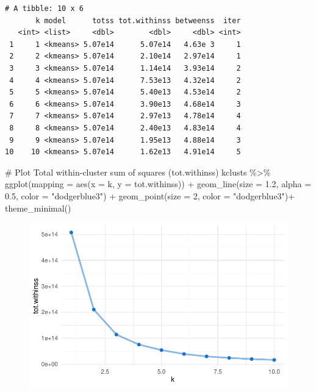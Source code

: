 \documentclass[
  letterpaper,
  DIV=11,
  numbers=noendperiod]{scrartcl}
\newenvironment{Shaded}{\begin{snugshade}}{\end{snugshade}}
\newcommand{\AttributeTok}[1]{\textcolor[rgb]{0.40,0.45,0.13}{#1}}
\newcommand{\CommentTok}[1]{\textcolor[rgb]{0.37,0.37,0.37}{#1}}
\newcommand{\DecValTok}[1]{\textcolor[rgb]{0.68,0.00,0.00}{#1}}
\newcommand{\FloatTok}[1]{\textcolor[rgb]{0.68,0.00,0.00}{#1}}
\newcommand{\FunctionTok}[1]{\textcolor[rgb]{0.28,0.35,0.67}{#1}}
\newcommand{\NormalTok}[1]{\textcolor[rgb]{0.00,0.23,0.31}{#1}}
\newcommand{\SpecialCharTok}[1]{\textcolor[rgb]{0.37,0.37,0.37}{#1}}
\newcommand{\StringTok}[1]{\textcolor[rgb]{0.13,0.47,0.30}{#1}}
\begin{document}
\begin{verbatim}
# A tibble: 10 x 6
       k model      totss tot.withinss betweenss  iter
   <int> <list>     <dbl>        <dbl>     <dbl> <int>
 1     1 <kmeans> 5.07e14      5.07e14   4.63e 3     1
 2     2 <kmeans> 5.07e14      2.10e14   2.97e14     1
 3     3 <kmeans> 5.07e14      1.14e14   3.93e14     2
 4     4 <kmeans> 5.07e14      7.53e13   4.32e14     2
 5     5 <kmeans> 5.07e14      5.40e13   4.53e14     2
 6     6 <kmeans> 5.07e14      3.90e13   4.68e14     3
 7     7 <kmeans> 5.07e14      2.97e13   4.78e14     4
 8     8 <kmeans> 5.07e14      2.40e13   4.83e14     4
 9     9 <kmeans> 5.07e14      1.95e13   4.88e14     3
10    10 <kmeans> 5.07e14      1.62e13   4.91e14     5
\end{verbatim}

\begin{Shaded}
\begin{Highlighting}[]
\CommentTok{\# Plot Total within{-}cluster sum of squares (tot.withinss)}
\NormalTok{kclusts }\SpecialCharTok{\%\textgreater{}\%} 
  \FunctionTok{ggplot}\NormalTok{(}\AttributeTok{mapping =} \FunctionTok{aes}\NormalTok{(}\AttributeTok{x =}\NormalTok{ k, }\AttributeTok{y =}\NormalTok{ tot.withinss)) }\SpecialCharTok{+}
  \FunctionTok{geom\_line}\NormalTok{(}\AttributeTok{size =} \FloatTok{1.2}\NormalTok{, }\AttributeTok{alpha =} \FloatTok{0.5}\NormalTok{, }\AttributeTok{color =} \StringTok{"dodgerblue3"}\NormalTok{) }\SpecialCharTok{+}
  \FunctionTok{geom\_point}\NormalTok{(}\AttributeTok{size =} \DecValTok{2}\NormalTok{, }\AttributeTok{color =} \StringTok{"dodgerblue3"}\NormalTok{)}\SpecialCharTok{+}
  \FunctionTok{theme\_minimal}\NormalTok{()}
\end{Highlighting}
\end{Shaded}

\begin{figure}[H]

{\centering \includegraphics{k-means_final_files/figure-pdf/unnamed-chunk-3-1.pdf}

}

\end{figure}
\end{document}
